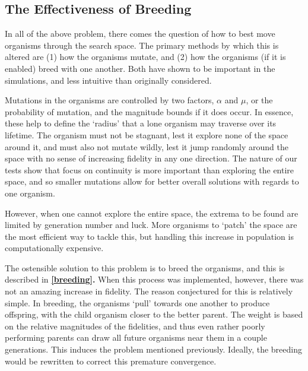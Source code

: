 \documentclass[11pt,twocolumn]{article}
\begin{document}

	\subsection{The Effectiveness of Breeding}
	
	In all of the above problem, there comes the question of how to best move organisms through the search space. The primary methods by which this is altered are (1) how the organisms mutate, and (2) how the organisms (if it is enabled) breed with one another. Both have shown to be important in the simulations, and less intuitive than originally considered. 

	Mutations in the organisms are controlled by two factors, $\alpha$ and $\mu$, or the probability of mutation, and the magnitude bounds if it does occur. In essence, these help to define the `radius' that a lone organism may traverse over its lifetime. The organism must not be stagnant, lest it explore none of the space around it, and must also not mutate wildly, lest it jump randomly around the space with no sense of increasing fidelity in any one direction. The nature of our tests show that focus on continuity is more important than exploring the entire space, and so smaller mutations allow for better overall solutions with regards to one organism. 

	However, when one cannot explore the entire space, the extrema to be found are limited by generation number and luck. More organisms to `patch' the space are the most efficient way to tackle this, but handling this increase in population is computationally expensive. 

	The ostensible solution to this problem is to breed the organisms, and this is described in \textbf{\ref{breeding}.} When this process was implemented, however, there was not an amazing increase in fidelity. The reason conjectured for this is relatively simple. In breeding, the organisms `pull' towards one another to produce offspring, with the child organism closer to the better parent. The weight is based on the relative magnitudes of the fidelities, and thus even rather poorly performing parents can draw all future organisms near them in a couple generations. This induces the problem mentioned previously. Ideally, the breeding would be rewritten to correct this premature convergence. 
	

\end{document}
